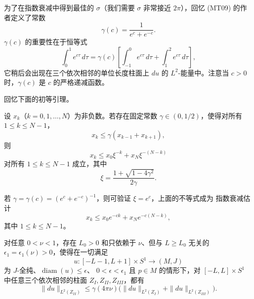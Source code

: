 为了在指数衰减中得到最佳的 $\sigma$（我们需要 $\sigma$ 非常接近 $2\pi$），回忆
(MT09) 的作者定义了常数
\[
 \gamma(c)=\frac1{e^c+e^{-c}}.
\]
$\gamma(c)$ 的重要性在于恒等式
\begin{equation}
\label{eq:app-b-gamma-identity}
 \int_0^1e^{c\tau}\,d\tau
 =\gamma(c)\left[
   \int_{-1}^0e^{c\tau}\,d\tau+
   \int_1^2e^{c\tau}\,d\tau\right],
\end{equation}
它稍后会出现在三个依次相邻的单位长度柱面上 $du$ 的 $L^2$-能量中。注意当
$c>0$ 时，$\gamma(c)$ 是 $c$ 的严格递减函数。

回忆下面的初等引理。

\begin{lemma}[(MT09)，引理 9.4]
\label{lem:app-b-three-interval-sequence}
设 $x_k$（$k=0,1,\ldots,N$）为非负数。若存在固定常数
$\gamma\in(0,1/2)$，使得对所有 $1\leq k\leq N-1$，
\[
 x_k\leq\gamma(x_{k-1}+x_{k+1}),
\]
则
\[
 x_k\leq x_0\xi^{-k}+x_N\xi^{-(N-k)}
\]
对所有 $1\leq k\leq N-1$ 成立，其中
\[
 \xi=\frac{1+\sqrt{1-4\gamma^2}}{2\gamma}.
\]
\end{lemma}

\begin{remark}
若 $\gamma=\gamma(c)=(e^c+e^{-c})^{-1}$，则可验证 $\xi=e^c$，上面的不等式成为
指数衰减估计
\begin{equation}
\label{eq:app-b-sequence-decay}
 x_k\leq x_0e^{-ck}+x_Ne^{-c(N-k)},
\end{equation}
其中 $1\leq k\leq N-1$。
\end{remark}

\begin{proposition}
\label{prop:app-b-local-four-pi}
对任意 $0<\nu<1$，存在 $L_0>0$ 和只依赖于 $\nu$、但与 $L\geq L_0$ 无关的
$\epsilon_1=\epsilon_1(\nu)>0$，使得在一切满足
\[
 u\colon[-L-1,L+1]\times S^1\longrightarrow(M,J)
\]
为 $J$-全纯、$\operatorname{diam}(u)\leq\epsilon$、
$0<\epsilon<\epsilon_1$ 且 $p\in M$ 的情形下，对
$[-L,L]\times S^1$ 中任意三个依次相邻的柱面 $Z_I,Z_{II},Z_{III}$，都有
\begin{equation}
\label{eq:app-b-gamma-four-pi}
 \|du\|_{L^2(Z_{II})}
 \leq\gamma(4\pi\nu)
 \bigl(\|du\|_{L^2(Z_I)}+\|du\|_{L^2(Z_{III})}\bigr).
\end{equation}
\end{proposition}

